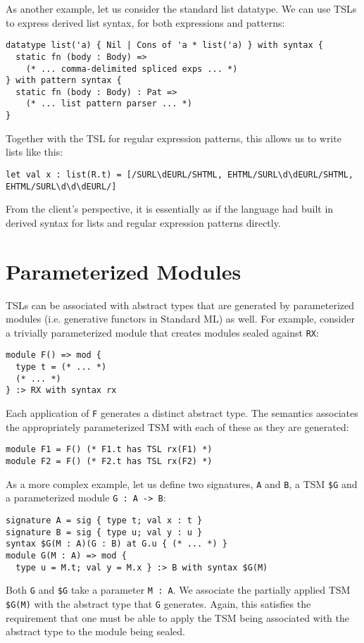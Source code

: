 As another example, let us consider the standard list datatype. We can use TSLs to express derived list syntax, for both expressions and patterns:
\begin{lstlisting}[numbers=none]
datatype list('a) { Nil | Cons of 'a * list('a) } with syntax {
  static fn (body : Body) => 
    (* ... comma-delimited spliced exps ... *)
} with pattern syntax {
  static fn (body : Body) : Pat => 
    (* ... list pattern parser ... *)
}
\end{lstlisting}
Together with the TSL for regular expression patterns, this allows us to write lists like this:
\begin{lstlisting}[numbers=none]
let val x : list(R.t) = [/SURL\dEURL/SHTML, EHTML/SURL\d\dEURL/SHTML, EHTML/SURL\d\d\dEURL/]
\end{lstlisting}
From the client's perspective, it is essentially as if the language had built in derived syntax for lists and regular expression patterns directly.%

\section{Parameterized Modules}
TSLs can be associated with abstract types that are generated by parameterized modules (i.e. generative functors in Standard ML) as well. For example, consider a trivially parameterized module that creates modules sealed against \lstinline{RX}:
\begin{lstlisting}[numbers=none]
module F() => mod {
  type t = (* ... *)
  (* ... *)
} :> RX with syntax rx 
\end{lstlisting}
Each application of \lstinline{F} generates a distinct abstract type. The semantics associates the appropriately parameterized TSM with each of these as they are generated:
\begin{lstlisting}[numbers=none]
module F1 = F() (* F1.t has TSL rx(F1) *)
module F2 = F() (* F2.t has TSL rx(F2) *)
\end{lstlisting}

As a more complex example, let us define two signatures, \lstinline{A} and \lstinline{B}, a TSM \texttt{\$G} and a parameterized module \lstinline{G : A -> B}:
\begin{lstlisting}[numbers=none,mathescape=|]
signature A = sig { type t; val x : t }
signature B = sig { type u; val y : u }
syntax $G(M : A)(G : B) at G.u { (* ... *) }
module G(M : A) => mod { 
  type u = M.t; val y = M.x } :> B with syntax $G(M)
\end{lstlisting}
Both \lstinline{G} and \texttt{\$G} take a parameter \lstinline{M : A}. We associate the partially applied TSM \texttt{\$G(M)} with the abstract type that \lstinline{G} generates. Again, this satisfies the requirement that one must be able to apply the TSM being associated with the abstract type to the module being sealed. 

